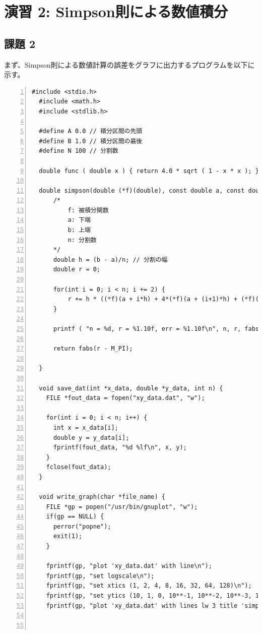 \documentclass[a4paper]{jsarticle}
\begin{document}
\section*{演習 2: Simpson則による数値積分}

\subsection*{課題 2}

まず、Simpson則による数値計算の誤差をグラフに出力するプログラムを以下に示す。
\begin{lstlisting}[caption={\texttt{Simpson則による数値計算とその誤差を求めるコード}}, numbers=left, label={Simpson1}]
  #include <stdio.h>
  #include <math.h>
  #include <stdlib.h>

  #define A 0.0 // 積分区間の先頭
  #define B 1.0 // 積分区間の最後
  #define N 100 // 分割数

  double func ( double x ) { return 4.0 * sqrt ( 1 - x * x ); }

  double simpson(double (*f)(double), const double a, const double b, const int n) {
      /*
          f: 被積分関数
          a: 下端
          b: 上端
          n: 分割数
      */
      double h = (b - a)/n; // 分割の幅
      double r = 0;

      for(int i = 0; i < n; i += 2) {
          r += h * ((*f)(a + i*h) + 4*(*f)(a + (i+1)*h) + (*f)(a + (i+2)*h)) / 3;
      }

      printf ( "n = %d, r = %1.10f, err = %1.10f\n", n, r, fabs ( r - M_PI ) );

      return fabs(r - M_PI);

  }

  void save_dat(int *x_data, double *y_data, int n) {
    FILE *fout_data = fopen("xy_data.dat", "w");

    for(int i = 0; i < n; i++) {
      int x = x_data[i];
      double y = y_data[i];
      fprintf(fout_data, "%d %lf\n", x, y);
    }
    fclose(fout_data);
  }

  void write_graph(char *file_name) {
    FILE *gp = popen("/usr/bin/gnuplot", "w");
    if(gp == NULL) {
      perror("popne");
      exit(1);
    }

    fprintf(gp, "plot 'xy_data.dat' with line\n");
    fprintf(gp, "set logscale\n");
    fprintf(gp, "set xtics (1, 2, 4, 8, 16, 32, 64, 128)\n");
    fprintf(gp, "set ytics (10, 1, 0, 10**-1, 10**-2, 10**-3, 10**-4, 10**-5, 10**-6, 10**-7, 10**-8)\n");
    fprintf(gp, "plot 'xy_data.dat' with lines lw 3 title 'simpson'\n");



\end{lstlisting}
\end{document}
